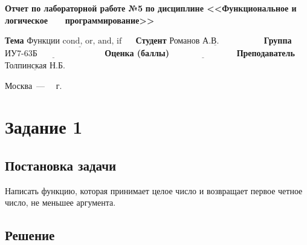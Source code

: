 \documentclass[12pt]{report}
\begin{document}
\begin{titlepage}
		\begin{center}
			\noindent\begin{minipage}{1.1\textwidth}\centering
				\Large\textbf{  Отчет по лабораторной работе №5}\newline
				\textbf{по дисциплине <<Функциональное и логическое}\newline
				\textbf{~~~программирование>>}\newline\newline
			\end{minipage}
		\end{center}
		
		\noindent\textbf{Тема} $\underline{\text{Функции cond, or, and, if~~~~}}$\newline\newline
		\noindent\textbf{Студент} $\underline{\text{Романов А.В.~~~~~~~~~~~~~~~}}$\newline\newline
		\noindent\textbf{Группа} $\underline{\text{ИУ7-63Б~~~~~~~~~~~~~~~~~~~~~~~}}$\newline\newline
		\noindent\textbf{Оценка (баллы)} $\underline{\text{~~~~~~~~~~~~~~~~~~~~~~}}$\newline\newline
		\noindent\textbf{Преподаватель} $\underline{\text{Толпинская Н.Б.}}$\newline\newline\newline
		
		\begin{center}
			\vfill
			Москва~---~\the\year
			~г.
		\end{center}
	\end{titlepage}
	
	
	
\section*{Задание 1}
\subsection*{Постановка задачи}
	
Написать функцию, которая принимает целое число и возвращает первое четное число, не меньшее аргумента. 

\subsection*{Решение}
\end{document}
